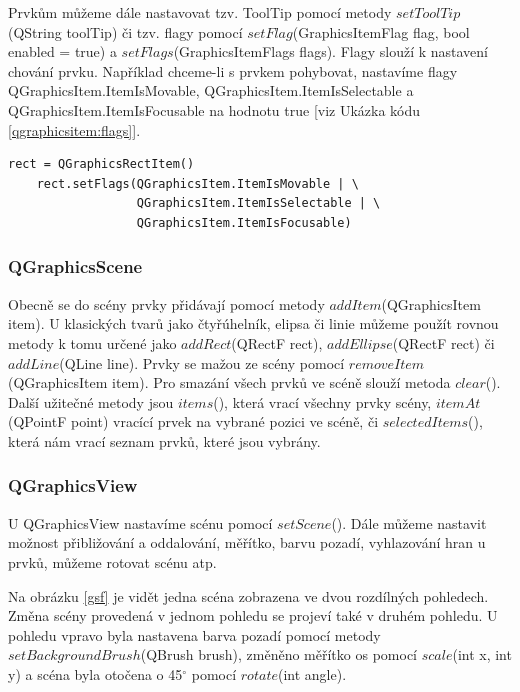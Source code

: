 Prvkům můžeme dále nastavovat tzv. ToolTip pomocí metody
$setToolTip$(QString toolTip) či tzv. flagy pomocí
$setFlag$(GraphicsItemFlag flag, bool enabled = true) a
$setFlags$(GraphicsItemFlags flags). Flagy slouží k nastavení chování
prvku. Například chceme-li s prvkem pohybovat, nastavíme flagy
QGraphicsItem.ItemIsMovable, QGraphicsItem.ItemIsSelectable a
QGraphicsItem.ItemIsFocusable na hodnotu true [viz Ukázka
kódu \ref{qgraphicsitem:flags}].\\
 
\begin{lstlisting}[label=qgraphicsitem:flags,caption={Nastavení flagů u QGraphicsRectItem}, morekeywords={QGraphicsItem, QGraphicsRectItem}] 
	rect = QGraphicsRectItem()
	rect.setFlags(QGraphicsItem.ItemIsMovable | \
				  QGraphicsItem.ItemIsSelectable | \
				  QGraphicsItem.ItemIsFocusable)
\end{lstlisting}
 
\subsubsection*{QGraphicsScene}
Obecně se do scény prvky přidávají pomocí metody
$addItem$(QGraphicsItem item). U klasických tvarů jako čtyřúhelník,
elipsa či linie můžeme použít rovnou metody k tomu určené jako
$addRect$(QRectF rect), $addEllipse$(QRectF rect) či $addLine$(QLine
line). Prvky se mažou ze scény pomocí $removeItem$(QGraphicsItem
item). Pro smazání všech prvků ve scéně slouží metoda $clear$(). Další
užitečné metody jsou $items$(), která vrací všechny prvky scény,
$itemAt$(QPointF point) vracící prvek na vybrané pozici ve scéně, či
$selectedItems$(), která nám vrací seznam prvků, které jsou vybrány.

\subsubsection*{QGraphicsView}
U QGraphicsView nastavíme scénu pomocí $setScene$(). Dále můžeme
nastavit možnost přibližování a oddalování, měřítko, barvu pozadí,
vyhlazování hran u prvků, můžeme rotovat scénu atp.

Na obrázku \ref{gsf} je vidět jedna scéna zobrazena ve dvou rozdílných
pohledech. Změna scény provedená v jednom pohledu se projeví také v
druhém pohledu. U pohledu vpravo byla nastavena barva pozadí pomocí
metody $setBackgroundBrush$(QBrush brush), změněno měřítko os pomocí
$scale$(int x, int y) a scéna byla otočena o 45$^\circ$ pomocí
$rotate$(int angle). \\

